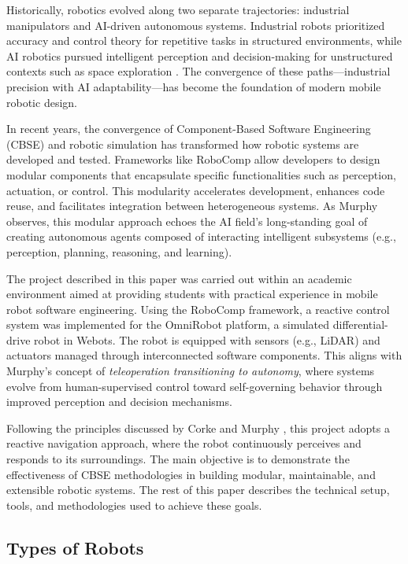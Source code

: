 \documentclass[conference]{IEEEtran}
\begin{document}
Historically, robotics evolved along two separate trajectories: industrial manipulators and AI-driven autonomous systems. Industrial robots prioritized accuracy and control theory for repetitive tasks in structured environments, while AI robotics pursued intelligent perception and decision-making for unstructured contexts such as space exploration \cite{murphy2000introduction}. The convergence of these paths—industrial precision with AI adaptability—has become the foundation of modern mobile robotic design.

In recent years, the convergence of Component-Based Software Engineering (CBSE) and robotic simulation has transformed how robotic systems are developed and tested. Frameworks like RoboComp \cite{rodriguez2011robocomp} allow developers to design modular components that encapsulate specific functionalities such as perception, actuation, or control. This modularity accelerates development, enhances code reuse, and facilitates integration between heterogeneous systems. As Murphy \cite{murphy2000introduction} observes, this modular approach echoes the AI field’s long-standing goal of creating autonomous agents composed of interacting intelligent subsystems (e.g., perception, planning, reasoning, and learning).

The project described in this paper was carried out within an academic environment aimed at providing students with practical experience in mobile robot software engineering. Using the RoboComp framework, a reactive control system was implemented for the OmniRobot platform, a simulated differential-drive robot in Webots. The robot is equipped with sensors (e.g., LiDAR) and actuators managed through interconnected software components. This aligns with Murphy’s concept of \textit{teleoperation transitioning to autonomy}, where systems evolve from human-supervised control toward self-governing behavior through improved perception and decision mechanisms.

Following the principles discussed by Corke \cite{corke2011robotics} and Murphy \cite{murphy2000introduction}, this project adopts a reactive navigation approach, where the robot continuously perceives and responds to its surroundings. The main objective is to demonstrate the effectiveness of CBSE methodologies in building modular, maintainable, and extensible robotic systems. The rest of this paper describes the technical setup, tools, and methodologies used to achieve these goals.

\subsection{Types of Robots}
\label{sec:robot_types}
\end{document}

